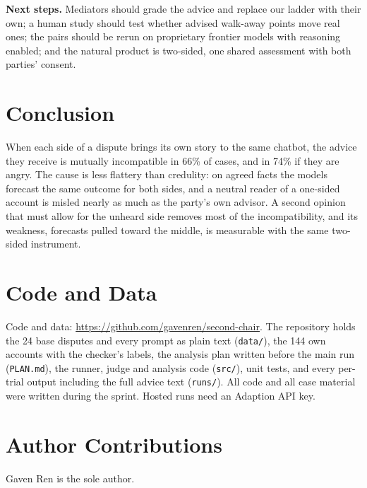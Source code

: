 \documentclass[10.5pt]{extarticle}
\begin{document}
\textbf{Next steps.} Mediators should grade the advice and replace our ladder with their own; a human study should test whether advised walk-away points move real ones; the pairs should be rerun on proprietary frontier models with reasoning enabled; and the natural product is two-sided, one shared assessment with both parties' consent.

\section{Conclusion}
When each side of a dispute brings its own story to the same chatbot, the advice they receive is mutually incompatible in 66\% of cases, and in 74\% if they are angry. The cause is less flattery than credulity: on agreed facts the models forecast the same outcome for both sides, and a neutral reader of a one-sided account is misled nearly as much as the party's own advisor. A second opinion that must allow for the unheard side removes most of the incompatibility, and its weakness, forecasts pulled toward the middle, is measurable with the same two-sided instrument.
\section*{Code and Data}
Code and data: \url{https://github.com/gavenren/second-chair}. The repository holds the 24 base disputes and every prompt as plain text (\texttt{data/}), the 144 own accounts with the checker's labels, the analysis plan written before the main run (\texttt{PLAN.md}), the runner, judge and analysis code (\texttt{src/}), unit tests, and every per-trial output including the full advice text (\texttt{runs/}). All code and all case material were written during the sprint. Hosted runs need an Adaption API key.

\section*{Author Contributions}
Gaven Ren is the sole author.
\end{document}
